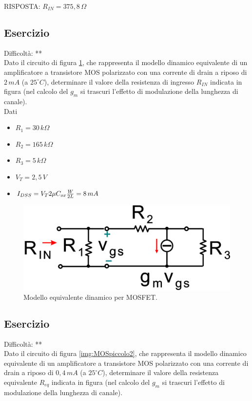 \documentclass[a4paper,portrait,12pt]{article}
\theoremstyle{definition}
\begin{document}
RISPOSTA: $R_{IN} = 375,8\,\Omega$


\subsection{Esercizio}

Difficoltà: **\\

Dato il circuito di figura \ref{img:MOSpiccolo1}, che rappresenta il modello dinamico equivalente di un 
amplificatore a transistore MOS polarizzato con una corrente di drain a riposo di $2\,mA$ (a $25^{\circ}C$), 
determinare il valore della resistenza di ingresso $R_{IN}$ indicata in figura (nel calcolo del $g_m$ si 
trascuri l'effetto di modulazione della lunghezza di canale).\\

Dati
\begin{itemize}
\item $R_1=30\,k\Omega$ 
\item $R_2=165\,k\Omega$
\item $R_3=5\,k\Omega$ 
\item $V_T=2,5\,V$ 
\item $I_{DSS}=V_T 2\mu C_{ox} {W \over 2L}=8\,mA$
\end{itemize}

\begin{figure}[H]
\centering
\includegraphics[width=.5\linewidth]{img/elettronicaEs/MOSpiccolo1.pdf}
\caption{Modello equivalente dinamico per MOSFET.}
\label{img:MOSpiccolo1}
\end{figure}

\subsection{Esercizio}

Difficoltà: **\\

Dato il circuito di figura \ref{img:MOSpiccolo2}, che rappresenta il modello dinamico equivalente di un 
amplificatore a transistore MOS polarizzato con una corrente di drain a riposo di $0,4\,mA$ (a $25^{\circ}C$),
determinare il valore della resistenza equivalente $R_{eq}$ indicata in figura (nel calcolo del $g_m$ si 
trascuri l'effetto di modulazione della lunghezza di canale).\\
\end{document}
